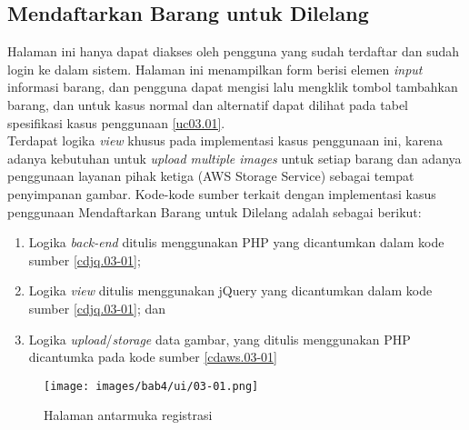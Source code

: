 \subsection{Mendaftarkan Barang untuk Dilelang}
\label{kasus-penggunaan-daftarbarang}
Halaman ini hanya dapat diakses oleh pengguna yang sudah terdaftar dan sudah login ke dalam sistem. Halaman ini menampilkan form berisi elemen \textit{input} informasi barang, dan pengguna dapat mengisi lalu mengklik tombol tambahkan barang, dan untuk kasus normal dan alternatif dapat dilihat pada tabel spesifikasi kasus penggunaan \ref{uc03.01}.\\
\indent Terdapat logika \textit{view} khusus pada implementasi kasus penggunaan ini, karena adanya kebutuhan untuk \textit{upload multiple images} untuk setiap barang dan adanya penggunaan layanan pihak ketiga (AWS Storage Service) sebagai tempat penyimpanan gambar. Kode-kode sumber terkait dengan implementasi kasus penggunaan Mendaftarkan Barang untuk Dilelang adalah sebagai berikut:
	\begin{enumerate}
		\item Logika \textit{back-end} ditulis menggunakan PHP yang dicantumkan dalam kode sumber \ref{cdjq.03-01}; 
		\item Logika \textit{view} ditulis menggunakan jQuery yang dicantumkan dalam kode sumber \ref{cdjq.03-01}; dan
		\item Logika \textit{upload}/\textit{storage} data gambar, yang ditulis menggunakan PHP dicantumka pada kode sumber \ref{cdaws.03-01}
	\end{enumerate} 

  \begin{figure}[H]
    \centering
    \texttt{[image: images/bab4/ui/03-01.png]}
    \caption{Halaman antarmuka registrasi}
    \label{ui.01-01}
  \end{figure}

